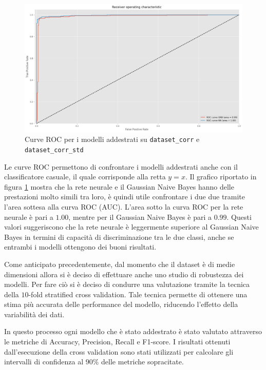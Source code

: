 \begin{figure}[!ht]
    \centering
    \includegraphics[width=\textwidth]{img/ris/roc_curve_corr.png}
    \caption{Curve ROC per i modelli addestrati su \texttt{dataset\_corr} e \texttt{dataset\_corr\_std}}
    \label{fig:roc_curve_corr}
\end{figure}

Le curve ROC permettono di confrontare i modelli addestrati anche con il classificatore
casuale, il quale corrisponde alla retta $y = x$. Il grafico riportato in figura
\ref{fig:roc_curve_corr} mostra che la rete neurale e il Gaussian Naive Bayes
hanno delle prestazioni molto simili tra loro, è quindi utile confrontare i due
due tramite l'area sottesa alla curva ROC (AUC). L'area sotto la curva ROC
per la rete neurale è pari a $1.00$, mentre per il Gaussian Naive Bayes è pari a
$0.99$. Questi valori suggeriscono che la rete neurale è leggermente superiore
al Gaussian Naive Bayes in termini di capacità di discriminazione tra le due
classi, anche se entrambi i modelli ottengono dei buoni risultati.

Come anticipato precedentemente, dal momento che il dataset è di medie dimensioni
allora si è deciso di effettuare anche uno studio di robustezza dei modelli.
Per fare ciò si è deciso di condurre una valutazione tramite la tecnica della
$10$-fold stratified cross validation. Tale tecnica permette di ottenere una
stima più accurata delle performance del modello, riducendo l'effetto della
variabilità dei dati.

In questo processo ogni modello che è stato addestrato è stato valutato attraverso
le metriche di Accuracy, Precision, Recall e F1-score. I risultati ottenuti
dall'esecuzione della cross validation sono stati utilizzati per calcolare gli
intervalli di confidenza al $90\%$ delle metriche sopracitate.

